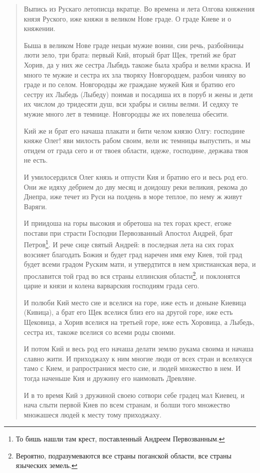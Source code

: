 \begin{quotation}
Выпись из Рускаго летописца вкратце. Во времена и лета Олгова княжения князя Руского, иже княжи в великом Нове граде. О граде Киеве и о княжении.

Быша в великом Нове граде нецыи мужие воини, сии речь, разбойницы люти зело, три брата: первый Кий, вторый брат Щек, третий же брат Хорив, да у них же сестра Лыбядь такоже была храбра и велми красна. И много те мужие и сестра их зла творяху Новгородцем, разбои чиняху во граде и по селом. Новгородцы же граждане мужей Кия и братию его сестру их Лыбедь (Лыбеду) поимав и посадиша их в поруб и жены и дети их числом до тридесяти душ, вси храбры и силны велми. И седяху те мужие много лет в темнице. Новгородцы же их повелеша обесити.

Кий же и брат его начаша плакати и бити челом князю Олгу: господине княже Олег! яви милость рабом своим, вели ис темницы выпустить, и мы отидем от града сего и от твоея области, идеже, господине, держава твоя не есть. 

И умилосердился Олег князь и отпусти Кия и братию его и весь род его. Они же идяху дебрием до дву месяц и доидошу реки великия, рекома до Днепра, иже течет из Руси на полдень в море теплое, по нему ж живут Варяги. 

И приидоша на горы высокия и обретоша на тех горах крест, егоже постави при страсти Господни Первозванный Апостол Андрей, брат Петров\footnote{То бишь нашли там крест, поставленный Андреем Первозванным.}. И рече сице святый Андрей: в последная лета на сих горах возсияет благодать Божия и будет град наречен имя ему Киев, той град будет всеми градом Руским мати, и утвердтится в нем христианская вера, и прославится той град во вся страны еллинския области\footnote{Вероятно, подразумеваются все страны поганской области, все страны языческих земель.}, и поклонятся царие и князи и колена варварския господиям града сего. 

И полюби Кий место сие и вселися на горе, иже есть и доныне Киевица (Кивица), а брат его Щек вселися близ его на другой горе, иже есть Щековица, а Хорив вселися на третьей горе, иже есть Хоровица, а Лыбедь, сестра их, такоже вселися со всеми роды своими. 

И потом Кий и весь род его начаша делати землю рукама своима и начаша славно жити. И приходжаху к ним многие люди от всех стран и вселяхуся тамо с Кием, и рапространися место сие, и людей множество в нем. И тогда наченьше Кия и дружину его наимовать Древляне.

И в то время Кий з дружиной своею сотвори себе градец мал Киевец, и нача слыти первой Киев по всем странам, и болши того множество множашеся людей к месту тому приходжаху.
\end{quotation}

